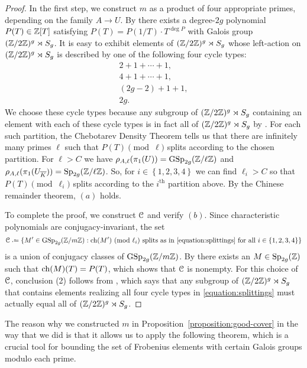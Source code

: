 	\begin{proof}
In the first step, we construct $m$ as a product of four appropriate primes,
depending on the family $A \to U$.
	By \cite[Theorem 1]{viana2002galois} there exists a degree-$2g$ polynomial $P(T) \in {\mathbb Z}[T]$ satisfying $P(T) = P(1/T) \cdot T^{\deg P}$ with Galois group $({\mathbb Z}/2{\mathbb Z})^g \rtimes S_g$.
		It is easy to exhibit elements of $({\mathbb Z}/2{\mathbb Z})^g \rtimes S_g$ whose left-action on $({\mathbb Z}/2{\mathbb Z})^g \rtimes S_g$ is described by one of the following four cycle types:
		\begin{equation} \label{equation:splittings}
			\begin{array}{c}
				2 + 1 + \cdots + 1, \\
				4 + 1 + \cdots + 1, \\
				(2g-2) + 1 + 1, \\
				2g.
			\end{array}
		\end{equation}
We choose these cycle types because any subgroup of $({\mathbb Z}/2{\mathbb Z})^g \rtimes S_g$ containing an element with each of these cycle types is in fact all of $({\mathbb Z}/2{\mathbb Z})^g \rtimes S_g$ by \cite[Lemma 7.1]{kowalski2006large}.
		For each such partition, the Chebotarev Density Theorem tells us that there are infinitely many primes $\ell$ such that $P(T) \pmod{\ell}$ splits according to the chosen partition. For $\ell > C$ we have $\rho_{A, \ell}(\pi_1(U)) = \operatorname{GSp}_{2g}({\mathbb Z} /  \ell \mathbb Z)$ and $\rho_{A, \ell}(\pi_1(U_{\overline{K}})) = \operatorname{Sp}_{2g}({\mathbb Z} /  \ell \mathbb Z)$.
So, for $i \in \left\{ 1,2,3,4 \right\}$ we can find $\ell_i > C$
so that $P(T) \pmod{\ell_i}$ splits according to the $i^{\mathrm{th}}$ partition above. 		
By the Chinese remainder theorem, $(a)$ holds.

To complete the proof, we construct $\mathcal C$ and verify $(b)$.
Since characteristic polynomials are conjugacy-invariant, the set
		\[
			\mc C \defeq \{M' \in \GSp_{2g}(\bz / m \ZZ) : \charpoly(M')\ (\on{mod}\, \ell_i) \text{ splits as in \eqref{equation:splittings} for all $i \in \left\{ 1,2,3,4 \right\}$}\}
		\]
		is a union of conjugacy classes of $\operatorname{GSp}_{2g}({\mathbb Z} /  m \mathbb Z)$. By \cite[Theorem A.1]{rivin2008walks} there exists an $M \in \operatorname{Sp}_{2g}({\mathbb Z})$ such that $\operatorname{ch}(M)(T) = P(T)$, which shows that $\mathcal C$ is nonempty. For this choice of $\mathcal C$, conclusion (2) follows from \cite[Lemma 7.1]{kowalski2006large}, which says that any subgroup of $({\mathbb Z}/2{\mathbb Z})^g \rtimes S_g$ that contains elements realizing all four cycle types in \eqref{equation:splittings} must actually equal all of $({\mathbb Z}/2{\mathbb Z})^g \rtimes S_g$.
	\end{proof}
    The reason why we constructed $m$ in Proposition~\ref{proposition:good-cover} in the way that we did is that it allows us to apply the following theorem, which is a crucial tool for bounding the set of Frobenius elements with certain Galois groups modulo each prime.

